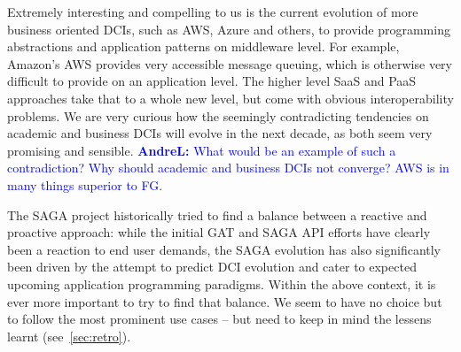 \documentclass{article}
\newcommand{\I}[1]{\textit{#1}}
\newcommand{\B}[1]{\textbf{#1}}
\newcommand{\todo}[1]{{\textcolor{red}{\B{TODO:} #1 }}}
\newcommand{\alnote}[1]{{\textcolor{blue}{    \B{AndreL:  } #1 }}}
\newcommand{\todo}[1]{}
\newcommand{\alnote}[1]{}
\begin{document}
  Extremely interesting and compelling to us is the current evolution of more
  business oriented DCIs, such as AWS, Azure and others, to provide programming
  abstractions and application patterns on middleware level.  For example,
  Amazon's AWS provides very accessible message queuing, which is otherwise very
  difficult to provide on an application level.  The higher level SaaS and PaaS
  approaches take that to a whole new level, but come with obvious
  interoperability problems.  We are very curious how the seemingly
  contradicting tendencies on academic and business DCIs will evolve in the next
  decade, as both seem very promising and sensible. \alnote{What would be an
  example of such a contradiction? Why should academic and business DCIs not
  converge?  AWS is in many things superior to FG.}




  The SAGA project historically tried to find a balance between a reactive and
  proactive approach: while the initial GAT and SAGA API efforts have clearly
  been a reaction to end user demands, the SAGA evolution has also significantly
  been driven by the attempt to predict DCI evolution and cater to expected
  upcoming application programming paradigms.  
  Within the above context, it is ever more important to try to find that
  balance.  We seem to have no choice but to follow the most prominent use cases
  -- but need to keep in mind the lessens learnt (see~\ref{sec:retro}).
 
\end{document}
